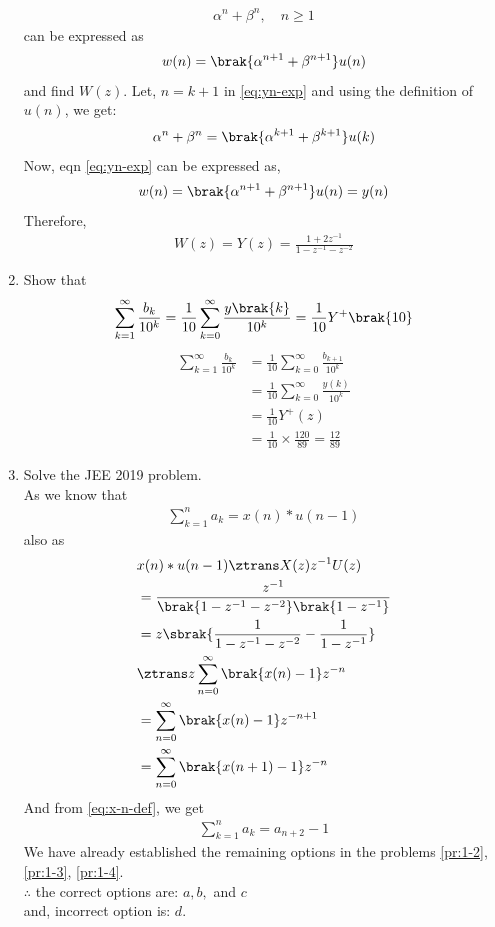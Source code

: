 \documentclass[journal,12pt,twocolumn]{IEEEtran}
\renewcommand\thesection{\arabic{section}}
\begin{document}
\begin{enumerate}[label=\thesection.\arabic*,ref=\thesection.\theenumi]
\begin{align}
	\alpha^n + \beta^n, \quad n \ge 1
	\label{eq:yn-exp}
\end{align}
can be expressed as 
\begin{align}
	w(n) =\brak{\alpha^{n+1} + \beta^{n+1}}u(n)
\end{align}
and find $W(z)$.
\solution Let, $n = k + 1$ in \eqref{eq:yn-exp} and using the definition of $u(n)$, we get: 
\begin{align}
	\alpha^n + \beta^n = \brak{\alpha^{k + 1} + \beta^{k + 1}}u(k)
\end{align}
Now, eqn \eqref{eq:yn-exp} can be expressed as,
\begin{align}
	w(n) = \brak{\alpha^{n+1} + \beta^{n+1}}u(n) = y(n)
\end{align}
Therefore,
\begin{align}
	W(z) = Y(z) = \frac{1 + 2z^{-1}}{1 - z^{-1} - z^{-2}}
\end{align}

\item Show that 
\begin{align}
	\sum_{k=1}^{\infty}\frac{b_k}{10^k} =
	\frac{1}{10}\sum_{k=0}^{\infty}\frac{y\brak{k}}{10^k} =\frac{1}{10}Y^{+}\brak{{10}}
\end{align}
\label{pr:1-4}
\solution
\begin{align}
	\sum_{k=1}^{\infty}\frac{b_k}{10^k} &= \frac{1}{10}\sum_{k = 0}^{\infty}\frac{b_{k+1}}{10^k} \\
	&= \frac{1}{10}\sum_{k = 0}^{\infty}\frac{y(k)}{10^k} \\
	&= \frac{1}{10}Y^+(z) \\
	&= \frac{1}{10}\times\frac{120}{89} = \frac{12}{89}
\end{align}
\break
\item Solve the JEE 2019 problem.\\
\label{pr:1-6}
\solution As we know that
\begin{align}
	\sum_{k = 1}^{n}a_k = x(n)*u(n - 1)
\end{align}
also as
\begin{align}
	&x(n)*u(n - 1) \ztrans X(z)z^{-1}U(z) \\
	&= \frac{z^{-1}}{\brak{1 - z^{-1} - z^{-2}}\brak{1 - z^{-1}}} \\
	&= z\sbrak{\frac{1}{1 - z^{-1} - z^{-2}} - \frac{1}{1 - z^{-1}}} \\
	&\ztrans z\sum_{n = 0}^{\infty}\brak{x(n) - 1}z^{-n} \\
	&= \sum_{n = 0}^{\infty}\brak{x(n) - 1}z^{-n + 1} \\
	&= \sum_{n = 0}^{\infty}\brak{x(n + 1) - 1}z^{-n} 
\end{align}
And from \eqref{eq:x-n-def}, we get
\begin{align}
	\sum_{k = 1}^{n}a_k = a_{n+2} - 1
\end{align}
We have already established the remaining options in the problems
\eqref{pr:1-2}, \eqref{pr:1-3}, \eqref{pr:1-4}. \\
$\therefore$ the correct options are: $a, b,$ and $c$\\
and, incorrect option is: $d$.
\end{enumerate}
\end{document}
